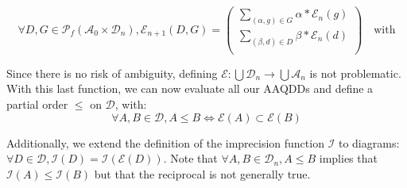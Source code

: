 $$\forall D, G \in \mathscr{P}_f(\mathcal{A}_0 \times \mathcal{D}_n), \mathcal{E}_{n+1}(D, G) =
\begin{pmatrix}
    \displaystyle\sum_{(\alpha, g) \in G} \alpha * \mathcal{E}_n(g) \\
    \displaystyle\sum_{(\beta, d) \in D} \beta * \mathcal{E}_n(d) \\
\end{pmatrix}
\quad\text{with}
$$

Since there is no risk of ambiguity, defining $\mathcal{E} : \bigcup \mathcal{D}_n \rightarrow \bigcup \mathcal{A}_n$ is not problematic. With this last function, we can now evaluate all our AAQDDs and define a partial order $\le$ on $\mathcal{D}$, with:
$$\forall A, B \in \mathcal{D}, A \le B \iff \mathcal{E}(A) \subset \mathcal{E}(B)$$

Additionally, we extend the definition of the imprecision function $\mathcal{I}$ to diagrams: $\forall D \in \mathcal{D}, \mathcal{I}(D) = \mathcal{I}(\mathcal{E}(D))$. Note that $\forall A, B \in \mathcal{D}_n, A \le B$ implies that $\mathcal{I}(A) \le \mathcal{I}(B)$ but that the reciprocal is not generally true.
